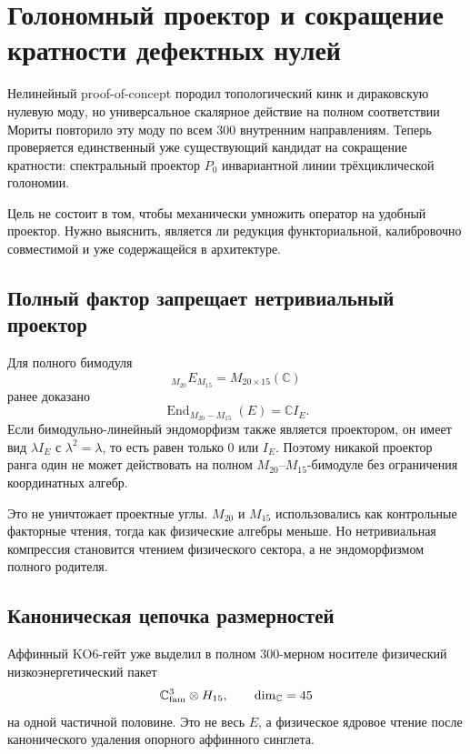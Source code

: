 \chapter{Голономный проектор и сокращение кратности дефектных нулей}

Нелинейный proof-of-concept породил топологический кинк и дираковскую
нулевую моду, но универсальное скалярное действие на полном соответствии
Мориты повторило эту моду по всем $300$ внутренним направлениям. Теперь
проверяется единственный уже существующий кандидат на сокращение
кратности: спектральный проектор $P_0$ инвариантной линии
трёхциклической голономии.

Цель не состоит в том, чтобы механически умножить оператор на удобный
проектор. Нужно выяснить, является ли редукция функториальной,
калибровочно совместимой и уже содержащейся в архитектуре.

\section{Полный фактор запрещает нетривиальный проектор}

Для полного бимодуля
\begin{equation}
 {}_{M_{20}}E_{M_{15}}=M_{20\times15}(\mathbb C)
\end{equation}
ранее доказано
\begin{equation}
 \operatorname{End}_{M_{20}-M_{15}}(E)=\mathbb C I_E.
 \label{eq:v5-projector-full-commutant}
\end{equation}
Если бимодульно-линейный эндоморфизм также является проектором, он имеет
вид $\lambda I_E$ с $\lambda^2=\lambda$, то есть равен только $0$ или
$I_E$. Поэтому никакой проектор ранга один не может действовать на полном
$M_{20}$--$M_{15}$-бимодуле без ограничения координатных алгебр.

Это не уничтожает проектные углы. $M_{20}$ и $M_{15}$ использовались как
контрольные факторные чтения, тогда как физические алгебры меньше. Но
нетривиальная компрессия становится чтением физического сектора, а не
эндоморфизмом полного родителя.

\section{Каноническая цепочка размерностей}

Аффинный KO6-гейт уже выделил в полном $300$-мерном носителе физический
низкоэнергетический пакет
\begin{equation}
 \mathbb C^3_{\rm fam}\otimes H_{15},
 \qquad \dim_{\mathbb C}=45
 \label{eq:v5-projector-light-sector}
\end{equation}
на одной частичной половине. Это не весь $E$, а физическое ядровое чтение
после канонического удаления опорного аффинного синглета.


